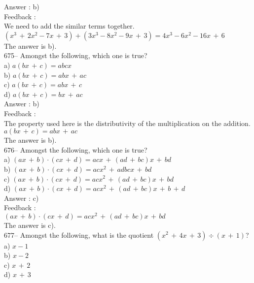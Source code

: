 \documentclass[letterpaper, 12pt]{article}
\begin{document}
Answer : b)\\

Feedback : \\
We need to add the similar terms together.\\
$\left( x^{3}\,+\,2x^{2}-7x\,+\,3\right)  + \left(
3x^{3}-8x^{2}-9x\,+\,3\right) =4x^{3}-6x^{2}-16x\,+\,6$\\
The answer is b).\\

675-- Amongst the following, which one is true?\\
a) $a\left( bx\,+\,c\right) =abcx$\\
b) $a\left( bx\,+\,c\right) =abx\,+\,ac$\\
c) $a\left( bx\,+\,c\right) =abx\,+\,c$\\
d) $a\left( bx\,+\,c\right) =bx\,+\,ac$\\

Answer : b)\\

Feedback : \\
The property used here is the distributivity of the multiplication on the addition.\\
$a\left( bx\,+\,c\right) =abx\,+\,ac$\\
The answer is b).\\

676-- Amongst the following, which one is true?\\
a) $\left( ax\,+\,b\right) \cdot\left( cx\,+\,d\right) =acx\,+\,\left(
ad\,+\,bc\right)x \,+\,bd$\\
b) $\left( ax\,+\,b\right) \cdot\left( cx\,+\,d\right) =acx^2\,+\,adbcx
\,+\,bd$\\
c) $\left( ax\,+\,b\right) \cdot\left( cx\,+\,d\right) =acx^2\,+\,\left(
ad\,+\,bc\right)x \,+\,bd$\\
d) $\left( ax\,+\,b\right) \cdot\left( cx\,+\,d\right) =acx^2\,+\,\left(
ad\,+\,bc\right)x \,+\,b\,+\,d$\\

Answer : c)\\

Feedback : \\
$\left( ax\,+\,b\right) \cdot\left( cx\,+\,d\right) =acx^2\,+\,\left(
ad\,+\,bc\right)x \,+\,bd$\\
The answer is c).\\

677-- Amongst the following, what is the quotient $\left(
x^{2}\,+\,4x\,+\,3\right) \div \left( x\,+\,1\right)$?\\
a) $x-1$\\
b) $x-2$ \\
c) $x\,+\,2$\\
d) $x\,+\,3$\\
\end{document}
